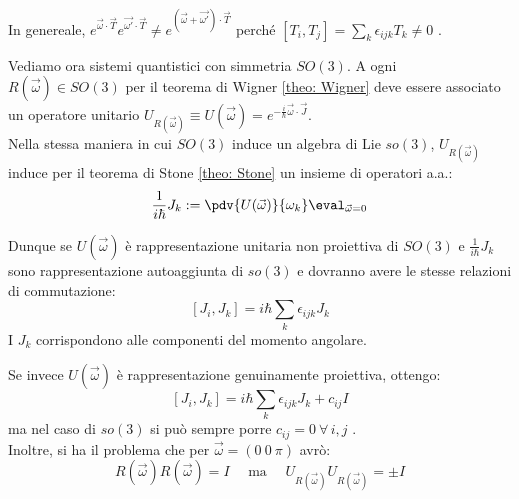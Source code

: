 \begin{remark}
    In genereale, \(e^{\vec{\omega}\cdot\vec{T}}e^{\vec{\omega'}\cdot\vec{T}} \neq e^{(\vec{\omega}+\vec{\omega'})\cdot\vec{T}}\) perché \(\left[ T_i, T_j \right]= \sum_k \epsilon_{ijk}T_k \neq 0\) .
\end{remark}

Vediamo ora sistemi quantistici con simmetria \(SO(3)\). A ogni \(R(\vec{\omega}) \in SO(3)\) per il teorema di Wigner \ref{theo: Wigner} deve essere associato un operatore unitario \(U_{R(\vec{\omega})}\equiv U(\vec{\omega})= e^{-\frac{i}{\hbar}\vec{\omega}\cdot\vec{J}}\).\\
Nella stessa maniera in cui \(SO(3)\) induce un algebra di Lie \(so(3)\), \(U_{R(\vec{\omega})}\) induce per il teorema di Stone \ref{theo: Stone} un insieme di operatori a.a.:
\begin{equation}
    \frac{1}{i\hbar} J_k := \pdv{U(\vec{\omega})}{\omega_k}\eval_{\vec{\omega}=0}
\end{equation}

Dunque se \(U(\vec{\omega})\) è rappresentazione unitaria non proiettiva di \(SO(3)\) e \(\frac{1}{i\hbar}J_k\) sono rappresentazione autoaggiunta di \(so(3)\) e dovranno avere le stesse relazioni di commutazione:
\begin{equation}
    \left[ J_i , J_k\right] = i\hbar\sum_k \epsilon_{ijk} J_k
\end{equation}
I \(J_k\) corrispondono alle componenti del momento angolare.

Se invece \(U(\vec{\omega})\) è rappresentazione genuinamente proiettiva, ottengo:
\[
    \left[ J_i , J_k\right] = i\hbar\sum_k \epsilon_{ijk} J_k + c_{ij} I 
\]
ma nel caso di \(so(3)\) si può sempre porre \(c_{ij}= 0 \ \forall\,i,j\) .\\
Inoltre, si ha il problema che per \(\vec{\omega}= (0 \ 0 \ \pi)\) avrò:
\[
    R(\vec{\omega })R(\vec{\omega}) = I  \quad  \text{ ma }\quad  U_{R(\vec{\omega}) }U_{R(\vec{\omega}) }= \pm I 
\]


